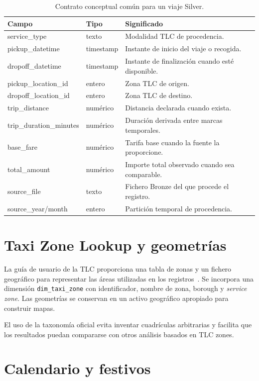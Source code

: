 \begin{table}[H]
\centering
\caption{Contrato conceptual común para un viaje Silver.}%
\label{tab:common-fields}%
\begin{tabularx}{\textwidth}{l l Y}
\toprule
\textbf{Campo} & \textbf{Tipo} & \textbf{Significado} \\
\midrule
service\_type & texto & Modalidad TLC de procedencia. \\
pickup\_datetime & timestamp & Instante de inicio del viaje o recogida. \\
dropoff\_datetime & timestamp & Instante de finalización cuando esté disponible. \\
pickup\_location\_id & entero & Zona TLC de origen. \\
dropoff\_location\_id & entero & Zona TLC de destino. \\
trip\_distance & numérico & Distancia declarada cuando exista. \\
trip\_duration\_minutes & numérico & Duración derivada entre marcas temporales. \\
base\_fare & numérico & Tarifa base cuando la fuente la proporcione. \\
total\_amount & numérico & Importe total observado cuando sea comparable. \\
source\_file & texto & Fichero Bronze del que procede el registro. \\
source\_year/month & entero & Partición temporal de procedencia. \\
\bottomrule
\end{tabularx}
\end{table}

\section{Taxi Zone Lookup y geometrías}

La guía de usuario de la TLC proporciona una tabla de zonas y un fichero geográfico para representar las áreas utilizadas en los registros~\cite{nyctlc_userguide}. Se incorpora una dimensión \texttt{dim\_taxi\_zone} con identificador, nombre de zona, borough y \textit{service zone}. Las geometrías se conservan en un activo geográfico apropiado para construir mapas.

El uso de la taxonomía oficial evita inventar cuadrículas arbitrarias y facilita que los resultados puedan compararse con otros análisis basados en TLC zones.

\section{Calendario y festivos}

